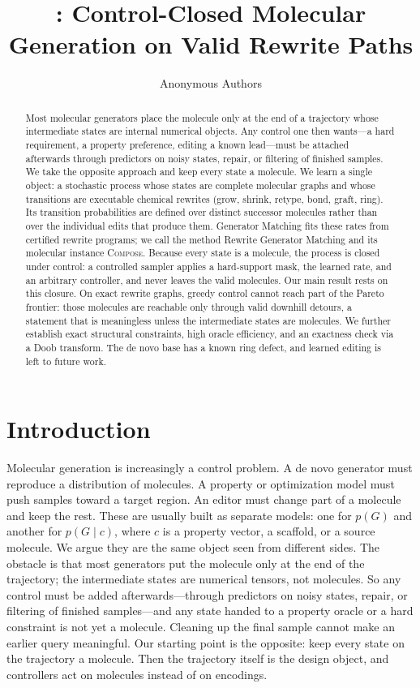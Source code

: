 \documentclass{article}
\title{\method: Control-Closed Molecular Generation on Valid Rewrite Paths}
\author{Anonymous Authors}
\date{}
\newcommand{\method}{\textsc{Compose}\xspace}
\theoremstyle{definition}
\theoremstyle{remark}
\begin{document}
\maketitle

\begin{abstract}
Most molecular generators place the molecule only at the end of a trajectory whose intermediate states are internal numerical objects. Any control one then wants---a hard requirement, a property preference, editing a known lead---must be attached afterwards through predictors on noisy states, repair, or filtering of finished samples. We take the opposite approach and keep every state a molecule. We learn a single object: a stochastic process whose states are complete molecular graphs and whose transitions are executable chemical rewrites (grow, shrink, retype, bond, graft, ring). Its transition probabilities are defined over distinct successor molecules rather than over the individual edits that produce them. Generator Matching fits these rates from certified rewrite programs; we call the method Rewrite Generator Matching and its molecular instance \method. Because every state is a molecule, the process is closed under control: a controlled sampler applies a hard-support mask, the learned rate, and an arbitrary controller, and never leaves the valid molecules. Our main result rests on this closure. On exact rewrite graphs, greedy control cannot reach part of the Pareto frontier: those molecules are reachable only through valid downhill detours, a statement that is meaningless unless the intermediate states are molecules. We further establish exact structural constraints, high oracle efficiency, and an exactness check via a Doob transform. The de novo base has a known ring defect, and learned editing is left to future work.
\end{abstract}

\section{Introduction}

Molecular generation is increasingly a control problem. A de novo generator must reproduce a distribution of molecules. A property or optimization model must push samples toward a target region. An editor must change part of a molecule and keep the rest. These are usually built as separate models: one for $p(G)$ and another for $p(G\mid c)$, where $c$ is a property vector, a scaffold, or a source molecule. We argue they are the same object seen from different sides. The obstacle is that most generators put the molecule only at the end of the trajectory; the intermediate states are numerical tensors, not molecules. So any control must be added afterwards---through predictors on noisy states, repair, or filtering of finished samples---and any state handed to a property oracle or a hard constraint is not yet a molecule. Cleaning up the final sample cannot make an earlier query meaningful. Our starting point is the opposite: keep every state on the trajectory a molecule. Then the trajectory itself is the design object, and controllers act on molecules instead of on encodings.
\end{document}
